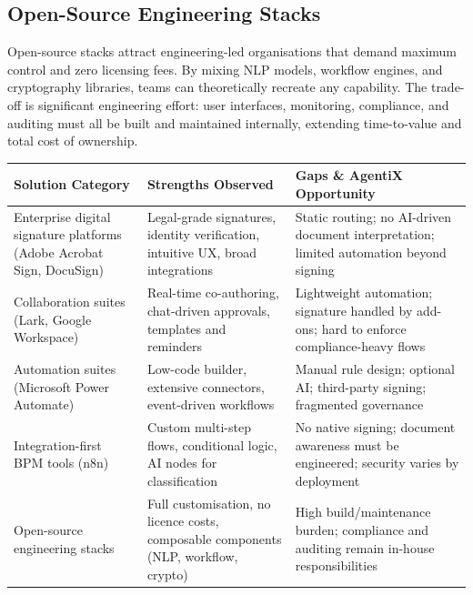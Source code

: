 \documentclass[12pt,oneside,openright,a4paper]{cpe-english-project}
\begin{document}
\subsection{Open-Source Engineering Stacks}
Open-source stacks attract engineering-led organisations that demand maximum control and zero licensing fees. By mixing NLP models, workflow engines, and cryptography libraries, teams can theoretically recreate any capability. The trade-off is significant engineering effort: user interfaces, monitoring, compliance, and auditing must all be built and maintained internally, extending time-to-value and total cost of ownership.

\begin{table}[!htbp]
\centering
\renewcommand{\arraystretch}{1.25}
\begin{tabular}{|>{\raggedright\arraybackslash}p{}|>{\raggedright\arraybackslash}p{}|>{\raggedright\arraybackslash}p{}|}
\hline
\textbf{Solution Category} & \textbf{Strengths Observed} & \textbf{Gaps \& AgentiX Opportunity} \\ \hline
Enterprise digital signature platforms (Adobe Acrobat Sign, DocuSign) & Legal-grade signatures, identity verification, intuitive UX, broad integrations & Static routing; no AI-driven document interpretation; limited automation beyond signing \\ \hline
Collaboration suites (Lark, Google Workspace) & Real-time co-authoring, chat-driven approvals, templates and reminders & Lightweight automation; signature handled by add-ons; hard to enforce compliance-heavy flows \\ \hline
Automation suites (Microsoft Power Automate) & Low-code builder, extensive connectors, event-driven workflows & Manual rule design; optional AI; third-party signing; fragmented governance \\ \hline
Integration-first BPM tools (n8n) & Custom multi-step flows, conditional logic, AI nodes for classification & No native signing; document awareness must be engineered; security varies by deployment \\ \hline
Open-source engineering stacks & Full customisation, no licence costs, composable components (NLP, workflow, crypto) & High build/maintenance burden; compliance and auditing remain in-house responsibilities \\ \hline
\end{tabular}
\end{table}
\end{document}
